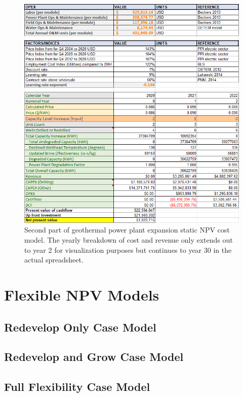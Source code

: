 \begin{figure}[!htp]
\centering
\includegraphics[width=\textwidth]{templates/images/Figure-Static_Model_SheetB.png}
\caption[Static cost model worksheet (part 2)]{Second part of geothermal power plant expansion static NPV cost model. The yearly breakdown of cost and revenue only extends out to year 2 for visualization purposes but continues to year 30 in the actual spreadsheet.}
\label{fig:static_model_sheet2}
\end{figure}

\section{Flexible NPV Models}

\subsection{Redevelop Only Case Model}

\subsection{Redevelop and Grow Case Model}

\subsection{Full Flexibility Case Model}